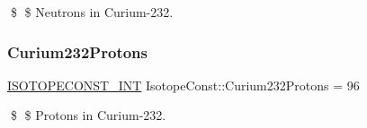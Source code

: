 \$ \$ Neutrons in Curium-\/232. \mbox{\label{group___isotope_const-_curium-_cm232_ga89a0fefb7058c30d709d478df34c3a90}} 
\subsubsection{\texorpdfstring{Curium232\+Protons}{Curium232Protons}}
{\footnotesize\ttfamily \mbox{\hyperlink{group___isotope_const-_macros_ga5f18360b3e99483a35c32d789e62621c}{I\+S\+O\+T\+O\+P\+E\+C\+O\+N\+S\+T\+\_\+\+I\+NT}} Isotope\+Const\+::\+Curium232\+Protons = 96}

\$ \$ Protons in Curium-\/232. 